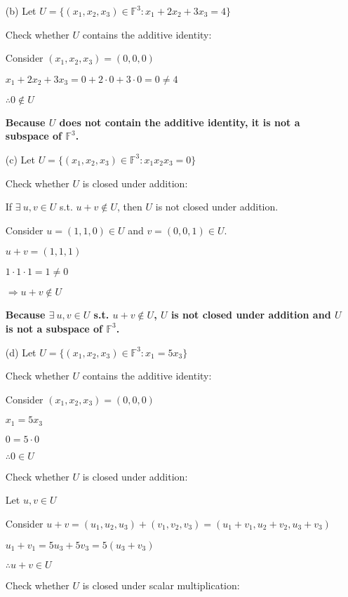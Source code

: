 \documentclass{article}
\begin{document}
\begin{enumerate}[nolistsep]
\begin{enumerate}[nolistsep]
			\item[(b)] Let $U = {\{(x_1, x_2, x_3) \in \mathbb{F}^3 : x_1 + 2x_2 + 3x_3 = 4 \}}$
			
			Check whether $U$ contains the additive identity:
			
			Consider $(x_1, x_2, x_3) = (0, 0, 0)$
			
			$x_1 + 2x_2 + 3x_3 = 0 + 2 \cdot 0 + 3 \cdot 0 = 0 \neq 4$
			
			$\therefore 0 \notin U$
			
			\textbf{Because $U$ does not contain the additive identity, it is not a subspace of $\mathbb{F}^3$.}

			\item[(c)] Let $U = {\{(x_1, x_2, x_3) \in \mathbb{F}^3 : x_1x_2x_3 = 0 \}}$
			
			Check whether $U$ is closed under addition:
			
			If $\exists\ u,v \in U$ s.t. $u + v \notin U$, then $U$ is not closed under addition.
			
			Consider $u = (1, 1, 0) \in U$ and $v = (0, 0, 1) \in U$.
			
			$u + v = (1, 1, 1)$
			
			$1 \cdot 1 \cdot 1 = 1 \neq 0$
			
			$\Rightarrow u + v \notin U$
			
			\textbf{Because $\exists\ u,v \in U$ s.t. $u + v \notin U$, $U$ is not closed under addition and  $U$ is not a subspace of $\mathbb{F}^3$.}
			
			\item[(d)] Let $U = {\{(x_1, x_2, x_3) \in \mathbb{F}^3 : x_1 = 5x_3 \}}$
			
			Check whether $U$ contains the additive identity:
			
			Consider $(x_1, x_2, x_3) = (0, 0, 0)$
			
			$x_1 = 5x_3$
			
			$0 = 5 \cdot 0$
			
			$\therefore 0 \in U$
			
			Check whether $U$ is closed under addition:
			
			Let $u, v \in U$
			
			Consider $u + v = (u_1, u_2, u_3) + (v_1, v_2, v_3) = (u_1 + v_1, u_2 + v_2, u_3 + v_3)$
			
			$u_1 + v_1 = 5u_3 + 5v_3 = 5(u_3 + v_3)$
			
			$\therefore u + v \in U$
			
			Check whether $U$ is closed under scalar multiplication:
			

\end{enumerate}
\end{enumerate}
\end{document}

